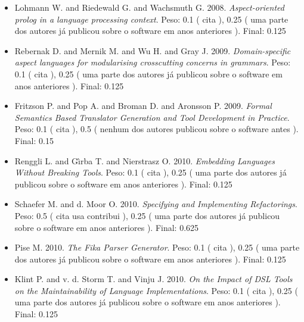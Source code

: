\begin{itemize}
\item Lohmann W. and Riedewald G. and Wachsmuth G.
      2008.
        \textit{ Aspect-oriented prolog in a language processing context}.
      Peso:
      0.1 (
          cita
      ),
      0.25 (
uma parte dos autores já publicou sobre o software em anos anteriores
      ).
      Final:
      0.125

\item Rebernak D. and Mernik M. and Wu H. and Gray J.
      2009.
        \textit{ Domain-specific aspect languages for modularising crosscutting concerns in grammars}.
      Peso:
      0.1 (
          cita
      ),
      0.25 (
uma parte dos autores já publicou sobre o software em anos anteriores
      ).
      Final:
      0.125

\item Fritzson P. and Pop A. and Broman D. and Aronsson P.
      2009.
        \textit{ Formal Semantics Based Translator Generation and Tool Development in Practice}.
      Peso:
      0.1 (
          cita
      ),
      0.5 (
nenhum dos autores publicou sobre o software antes
      ).
      Final:
      0.15

\item Renggli L. and G\^{\i}rba T. and Nierstrasz O.
      2010.
        \textit{ Embedding Languages Without Breaking Tools}.
      Peso:
      0.1 (
          cita
      ),
      0.25 (
uma parte dos autores já publicou sobre o software em anos anteriores
      ).
      Final:
      0.125

\item Schaefer M. and d. Moor O.
      2010.
        \textit{ Specifying and Implementing Refactorings}.
      Peso:
      0.5 (
          cita
          usa
          contribui
      ),
      0.25 (
uma parte dos autores já publicou sobre o software em anos anteriores
      ).
      Final:
      0.625

\item Pise M.
      2010.
        \textit{ The Fika Parser Generator}.
      Peso:
      0.1 (
          cita
      ),
      0.25 (
uma parte dos autores já publicou sobre o software em anos anteriores
      ).
      Final:
      0.125

\item Klint P. and v. d. Storm T. and Vinju J.
      2010.
        \textit{ On the Impact of DSL Tools on the Maintainability of Language Implementations}.
      Peso:
      0.1 (
          cita
      ),
      0.25 (
uma parte dos autores já publicou sobre o software em anos anteriores
      ).
      Final:
      0.125


\end{itemize}
